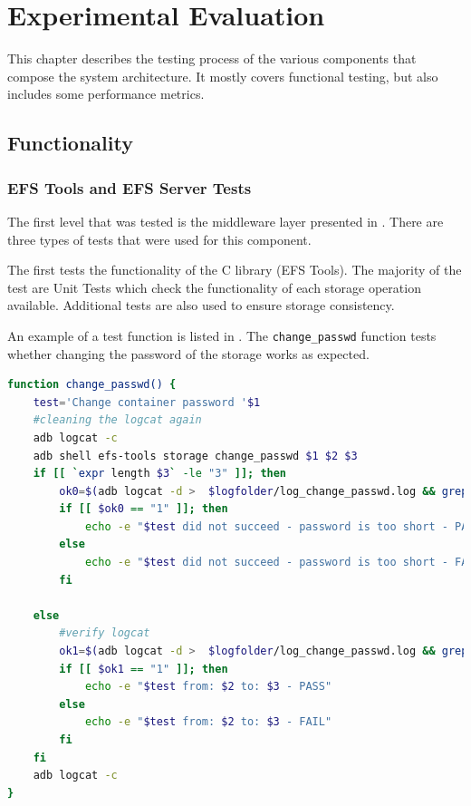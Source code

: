 \chapter{Experimental Evaluation}
\label{chapter:eval}

This chapter describes the testing process of the various components that compose the system architecture. It mostly covers functional testing, but also includes some performance metrics.

\section{Functionality}
\label{sec:func-eval}

\subsection{EFS Tools and EFS Server Tests}
\label{sub-sec:efs-tools-server-tests-eval}

The first level that was tested is the middleware layer presented in . There are three types of tests that were used for this component.

The first tests the functionality of the C library (EFS Tools). The majority of the test are Unit Tests which check the functionality of each storage operation available. Additional tests are also used to ensure storage consistency.

An example of a test function is listed in . The \texttt{change_passwd} function tests whether changing the password of the storage works as expected.

\begin{lstlisting}[language=bash, basicstyle=\small, caption=change_passwd test function, label=lst:change-passwd-eval]
function change_passwd() {
    test='Change container password '$1
    #cleaning the logcat again
    adb logcat -c
    adb shell efs-tools storage change_passwd $1 $2 $3
    if [[ `expr length $3` -le "3" ]]; then
        ok0=$(adb logcat -d >  $logfolder/log_change_passwd.log && grep -c 'New passwd too short' $logfolder/log_change_passwd.log)
        if [[ $ok0 == "1" ]]; then
            echo -e "$test did not succeed - password is too short - PASS"
        else
            echo -e "$test did not succeed - password is too short - FAIL"
        fi

    else
        #verify logcat
        ok1=$(adb logcat -d >  $logfolder/log_change_passwd.log && grep -c 'Change passwd successful for '$1' storage' $logfolder/log_change_passwd.log)
        if [[ $ok1 == "1" ]]; then
            echo -e "$test from: $2 to: $3 - PASS"
        else
            echo -e "$test from: $2 to: $3 - FAIL"
        fi
    fi
    adb logcat -c
}
\end{lstlisting}


